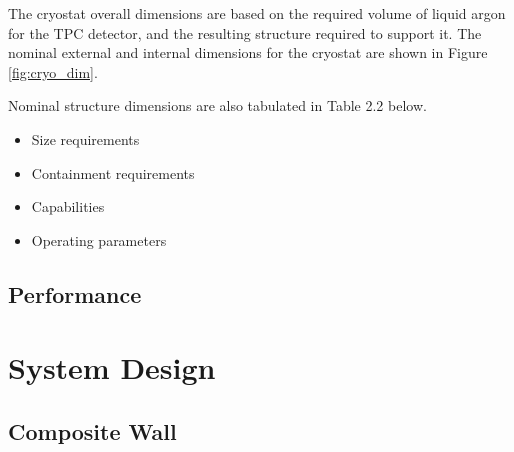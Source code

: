 The cryostat overall dimensions are based on the required volume of liquid argon for the TPC detector, and the resulting structure required to support it.  The nominal external and internal dimensions for the cryostat are shown in Figure \ref{fig:cryo_dim}.

Nominal structure dimensions are also tabulated in Table 2.2 below.

\begin{itemize}
\item Size requirements
\item Containment requirements
\item Capabilities
\item Operating parameters
\end{itemize}




\subsection{Performance}
\label{sec:cryost-ovvw-perf}



\section{System Design}
\label{sec:cryost-des}

\subsection{Composite Wall}
\label{sec:cryost-des-wall}



